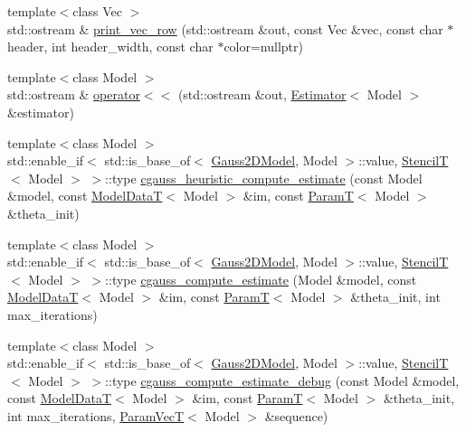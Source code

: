 \begin{DoxyCompactItemize}
\item 
{\footnotesize template$<$class Vec $>$ }\\std\+::ostream \& \hyperlink{namespacemappel_adb38bc84f5b9500d9019091e80e7ada8}{print\+\_\+vec\+\_\+row} (std\+::ostream \&out, const Vec \&vec, const char $\ast$header, int header\+\_\+width, const char $\ast$color=nullptr)
\item 
{\footnotesize template$<$class Model $>$ }\\std\+::ostream \& \hyperlink{namespacemappel_a4d47cff4f8160c609b643f7a0b021ddd}{operator$<$$<$} (std\+::ostream \&out, \hyperlink{classmappel_1_1Estimator}{Estimator}$<$ Model $>$ \&estimator)
\item 
{\footnotesize template$<$class Model $>$ }\\std\+::enable\+\_\+if$<$ std\+::is\+\_\+base\+\_\+of$<$ \hyperlink{classmappel_1_1Gauss2DModel}{Gauss2\+D\+Model}, Model $>$\+::value, \hyperlink{namespacemappel_a3a06598240007876f8c4bf834ad86197}{StencilT}$<$ Model $>$ $>$\+::type \hyperlink{namespacemappel_a9a33407dfb369f92a6679b66aa6108da}{cgauss\+\_\+heuristic\+\_\+compute\+\_\+estimate} (const Model \&model, const \hyperlink{namespacemappel_a97f050df953605381ae9c901c3b125f1}{Model\+DataT}$<$ Model $>$ \&im, const \hyperlink{namespacemappel_a667925cb0d6c0e49f2f035cc5a9a6857}{ParamT}$<$ Model $>$ \&theta\+\_\+init)
\item 
{\footnotesize template$<$class Model $>$ }\\std\+::enable\+\_\+if$<$ std\+::is\+\_\+base\+\_\+of$<$ \hyperlink{classmappel_1_1Gauss2DModel}{Gauss2\+D\+Model}, Model $>$\+::value, \hyperlink{namespacemappel_a3a06598240007876f8c4bf834ad86197}{StencilT}$<$ Model $>$ $>$\+::type \hyperlink{namespacemappel_a5dcd5454ad7d457abff33c2742bd087d}{cgauss\+\_\+compute\+\_\+estimate} (Model \&model, const \hyperlink{namespacemappel_a97f050df953605381ae9c901c3b125f1}{Model\+DataT}$<$ Model $>$ \&im, const \hyperlink{namespacemappel_a667925cb0d6c0e49f2f035cc5a9a6857}{ParamT}$<$ Model $>$ \&theta\+\_\+init, int max\+\_\+iterations)
\item 
{\footnotesize template$<$class Model $>$ }\\std\+::enable\+\_\+if$<$ std\+::is\+\_\+base\+\_\+of$<$ \hyperlink{classmappel_1_1Gauss2DModel}{Gauss2\+D\+Model}, Model $>$\+::value, \hyperlink{namespacemappel_a3a06598240007876f8c4bf834ad86197}{StencilT}$<$ Model $>$ $>$\+::type \hyperlink{namespacemappel_a221fb6e708648c7d730b4880d4961cf9}{cgauss\+\_\+compute\+\_\+estimate\+\_\+debug} (const Model \&model, const \hyperlink{namespacemappel_a97f050df953605381ae9c901c3b125f1}{Model\+DataT}$<$ Model $>$ \&im, const \hyperlink{namespacemappel_a667925cb0d6c0e49f2f035cc5a9a6857}{ParamT}$<$ Model $>$ \&theta\+\_\+init, int max\+\_\+iterations, \hyperlink{namespacemappel_a0f86d3153e4e27b095012f140eea58de}{Param\+VecT}$<$ Model $>$ \&sequence)

\end{DoxyCompactItemize}
